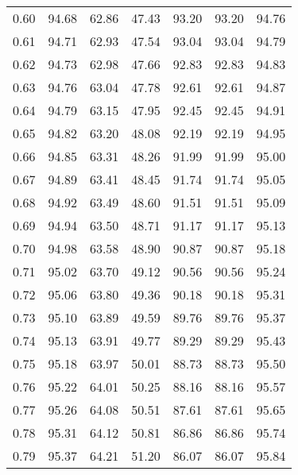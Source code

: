 \begin{tabular}{|c|c|c|c|c|c|c|}
      0.60 &     94.68 &     62.86 &      47.43 &   93.20 &      93.20 &         94.76 \\
      0.61 &     94.71 &     62.93 &      47.54 &   93.04 &      93.04 &         94.79 \\
      0.62 &     94.73 &     62.98 &      47.66 &   92.83 &      92.83 &         94.83 \\
      0.63 &     94.76 &     63.04 &      47.78 &   92.61 &      92.61 &         94.87 \\
      0.64 &     94.79 &     63.15 &      47.95 &   92.45 &      92.45 &         94.91 \\
      0.65 &     94.82 &     63.20 &      48.08 &   92.19 &      92.19 &         94.95 \\
      0.66 &     94.85 &     63.31 &      48.26 &   91.99 &      91.99 &         95.00 \\
      0.67 &     94.89 &     63.41 &      48.45 &   91.74 &      91.74 &         95.05 \\
      0.68 &     94.92 &     63.49 &      48.60 &   91.51 &      91.51 &         95.09 \\
      0.69 &     94.94 &     63.50 &      48.71 &   91.17 &      91.17 &         95.13 \\
      0.70 &     94.98 &     63.58 &      48.90 &   90.87 &      90.87 &         95.18 \\
      0.71 &     95.02 &     63.70 &      49.12 &   90.56 &      90.56 &         95.24 \\
      0.72 &     95.06 &     63.80 &      49.36 &   90.18 &      90.18 &         95.31 \\
      0.73 &     95.10 &     63.89 &      49.59 &   89.76 &      89.76 &         95.37 \\
      0.74 &     95.13 &     63.91 &      49.77 &   89.29 &      89.29 &         95.43 \\
      0.75 &     95.18 &     63.97 &      50.01 &   88.73 &      88.73 &         95.50 \\
      0.76 &     95.22 &     64.01 &      50.25 &   88.16 &      88.16 &         95.57 \\
      0.77 &     95.26 &     64.08 &      50.51 &   87.61 &      87.61 &         95.65 \\
      0.78 &     95.31 &     64.12 &      50.81 &   86.86 &      86.86 &         95.74 \\
      0.79 &     95.37 &     64.21 &      51.20 &   86.07 &      86.07 &         95.84 \\

\end{tabular}
